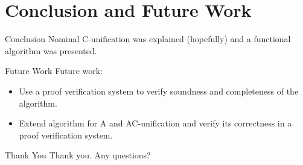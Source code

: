 \section{Conclusion and Future Work}

\begin{frame}{Conclusion}
    Nominal C-unification was explained (hopefully) and a functional algorithm was
    presented.  
\end{frame}

\begin{frame}{Future Work}
    Future work:  
    \begin{itemize}
        \item Use a proof verification system to verify soundness and completeness of
            the algorithm. 
        \item Extend algorithm for A and AC-unification and verify its correctness in
            a proof verification system. 
    \end{itemize}
\end{frame}

\begin{frame}{Thank You}
    Thank you. Any questions?
\end{frame}
